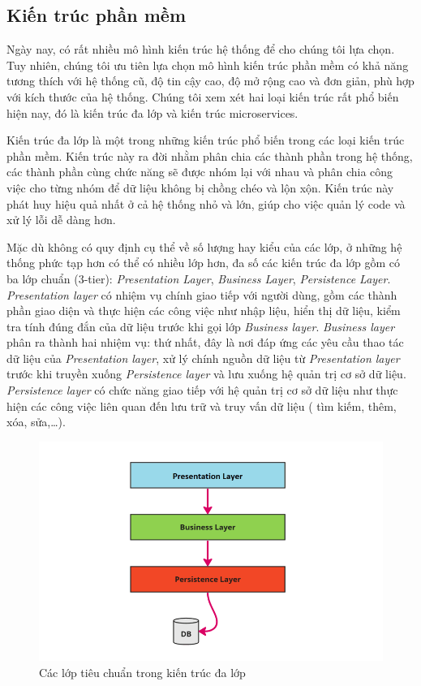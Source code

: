 \subsection{Kiến trúc phần mềm}

Ngày nay, có rất nhiều mô hình kiến trúc hệ thống để cho chúng tôi lựa chọn.
Tuy nhiên, chúng tôi ưu tiên lựa chọn mô hình kiến trúc phần mềm có khả năng
tương thích với hệ thống cũ, độ tin cậy cao, độ mở rộng cao và đơn giản, phù hợp với
kích thước của hệ thống. Chúng tôi xem xét hai loại kiến trúc rất phổ biến hiện nay, đó là 
kiến trúc đa lớp và kiến trúc microservices.

\par
Kiến trúc đa lớp là một trong những kiến trúc phổ biến trong các loại kiến trúc phần mềm. Kiến trúc
này ra đời nhằm phân chia các thành phần trong hệ thống, các thành phần cùng
chức năng sẽ được nhóm lại với nhau và phân chia công việc cho từng nhóm để dữ
liệu không bị chồng chéo và lộn xộn. Kiến trúc này phát huy hiệu quả nhất ở cả hệ 
thống nhỏ và lớn, giúp cho việc quản lý code và xử lý lỗi dễ
dàng hơn.
\par
Mặc dù không có quy định cụ thể về số lượng hay kiểu của các lớp, ở những hệ
thống phức tạp hơn có thể có nhiều lớp hơn, đa số các kiến trúc đa lớp gồm có
ba lớp chuẩn (3-tier): \emph{Presentation Layer}, \emph{Business Layer},
\emph{Persistence Layer}. \emph{Presentation layer} có nhiệm vụ chính giao tiếp với
người dùng, gồm các thành phần giao diện và thực hiện các công việc như nhập
liệu, hiển thị dữ liệu, kiểm tra tính đúng đắn của dữ liệu trước khi gọi lớp
\emph{Business layer}. \emph{Business layer} phân ra thành hai nhiệm vụ: thứ
nhất, đây là nơi đáp ứng các yêu cầu thao tác dữ liệu của \emph{Presentation
    layer}, xử lý chính nguồn dữ liệu từ \emph{Presentation layer} trước khi truyền
xuống \emph{Persistence layer} và lưu xuống hệ quản trị cơ sở dữ liệu. \emph{Persistence 
layer} có chức năng giao tiếp với hệ quản trị cơ sở dữ liệu như thực hiện các công việc
liên quan đến lưu trữ và truy vấn dữ liệu ( tìm kiếm, thêm, xóa, sửa,…).
\begin{figure}[H]
    \centering
    \includegraphics[width=\linewidth]{Content/Phân tích và thiết kế hệ thống/documents/Kiến trúc hệ thống/images/n tier architecture.png}
    \caption{Các lớp tiêu chuẩn trong kiến trúc đa lớp}
\end{figure}
